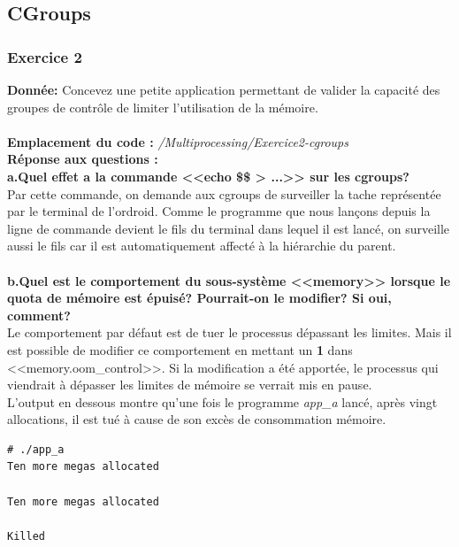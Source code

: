 \subsection{CGroups}
\subsubsection{Exercice 2}
\textbf{Donnée:} Concevez	une	petite	application	permettant	de	valider	la	capacité	des	groupes	de	contrôle	de	limiter	
l’utilisation	de	la mémoire.	\\\\

\textbf{Emplacement du code : } \textit{/Multiprocessing/Exercice2-cgroups}\\

\textbf{Réponse aux questions :}\\

\textbf{a.Quel effet a la commande <<echo \$\$ > ...>> sur les cgroups?}\\
Par cette commande, on demande aux cgroups de surveiller la tache représentée par le terminal de l'ordroid. Comme le programme que nous lançons depuis la ligne de commande devient le fils du terminal dans lequel il est lancé, on surveille aussi le fils car il est automatiquement affecté à la hiérarchie du parent. \\\\

\textbf{b.Quel est le comportement du sous-système <<memory>> lorsque le quota de mémoire est épuisé? Pourrait-on le modifier? Si oui, comment?}\\
Le comportement par défaut est de tuer le processus dépassant les limites. Mais il est possible de modifier ce comportement en mettant un \textbf{1} dans <<memory.oom\_control>>. Si la modification a été apportée, le processus qui viendrait à dépasser les limites de mémoire se verrait mis en pause.\\

L'output en dessous montre qu'une fois le programme \textit{app\_a} lancé, après vingt allocations, il est tué à cause de son excès de consommation mémoire. 
\begin{lstlisting}
# ./app_a 
Ten more megas allocated

Ten more megas allocated

Killed
\end{lstlisting}


